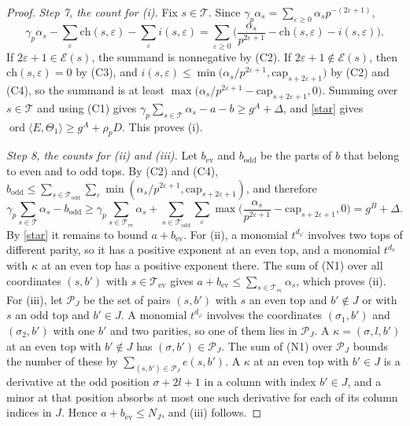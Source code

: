 \begin{proof}
\emph{Step 7, the count for (i).} Fix $s\in\mathcal T$. Since $\gamma_p\alpha_s=\sum_{\varepsilon\ge0}\alpha_sp^{-(2\varepsilon+1)}$,
\[
\gamma_p\alpha_s-\sum_\varepsilon\mathrm{ch}(s,\varepsilon)-\sum_\varepsilon i(s,\varepsilon)=\sum_{\varepsilon\ge0}\Big(\frac{\alpha_s}{p^{2\varepsilon+1}}-\mathrm{ch}(s,\varepsilon)-i(s,\varepsilon)\Big).
\]
If $2\varepsilon+1\in\mathcal E(s)$, the summand is nonnegative by (C2). If $2\varepsilon+1\notin\mathcal E(s)$, then $\mathrm{ch}(s,\varepsilon)=0$ by (C3), and $i(s,\varepsilon)\le\min\big(\alpha_s/p^{2\varepsilon+1},\mathrm{cap}_{s+2\varepsilon+1}\big)$ by (C2) and (C4), so the summand is at least $\max\big(\alpha_s/p^{2\varepsilon+1}-\mathrm{cap}_{s+2\varepsilon+1},0\big)$. Summing over $s\in\mathcal T$ and using (C1) gives $\gamma_p\sum_{s\in\mathcal T}\alpha_s-a-b\ge g^A+\Delta$, and \eqref{star} gives $\operatorname{ord}\langle E,\Theta_1\rangle\ge g^A+\rho_pD$. This proves (i).

\emph{Step 8, the counts for (ii) and (iii).} Let $b_{\mathrm{ev}}$ and $b_{\mathrm{odd}}$ be the parts of $b$ that belong to even and to odd tops. By (C2) and (C4), $b_{\mathrm{odd}}\le\sum_{s\in\mathcal T_{\mathrm{odd}}}\sum_\varepsilon\min(\alpha_s/p^{2\varepsilon+1},\mathrm{cap}_{s+2\varepsilon+1})$, and therefore
\[
\gamma_p\sum_{s\in\mathcal T}\alpha_s-b_{\mathrm{odd}}\ge\gamma_p\sum_{s\in\mathcal T_{\mathrm{ev}}}\alpha_s+\sum_{s\in\mathcal T_{\mathrm{odd}}}\sum_\varepsilon\max\Big(\frac{\alpha_s}{p^{2\varepsilon+1}}-\mathrm{cap}_{s+2\varepsilon+1},0\Big)=g^B+\Delta .
\]
By \eqref{star} it remains to bound $a+b_{\mathrm{ev}}$. For (ii), a monomial $t^{d_\varphi}$ involves two tops of different parity, so it has a positive exponent at an even top, and a monomial $t^{d_\kappa}$ with $\kappa$ at an even top has a positive exponent there. The sum of (N1) over all coordinates $(s,b')$ with $s\in\mathcal T_{\mathrm{ev}}$ gives $a+b_{\mathrm{ev}}\le\sum_{s\in\mathcal T_{\mathrm{ev}}}\alpha_s$, which proves (ii). For (iii), let $\mathcal P_J$ be the set of pairs $(s,b')$ with $s$ an even top and $b'\notin J$ or with $s$ an odd top and $b'\in J$. A monomial $t^{d_\varphi}$ involves the coordinates $(\sigma_1,b')$ and $(\sigma_2,b')$ with one $b'$ and two parities, so one of them lies in $\mathcal P_J$. A $\kappa=(\sigma,l,b')$ at an even top with $b'\notin J$ has $(\sigma,b')\in\mathcal P_J$. The sum of (N1) over $\mathcal P_J$ bounds the number of these by $\sum_{(s,b')\in\mathcal P_J}e(s,b')$. A $\kappa$ at an even top with $b'\in J$ is a derivative at the odd position $\sigma+2l+1$ in a column with index $b'\in J$, and a minor at that position absorbs at most one such derivative for each of its column indices in $J$. Hence $a+b_{\mathrm{ev}}\le N_J$, and (iii) follows.
\end{proof}
